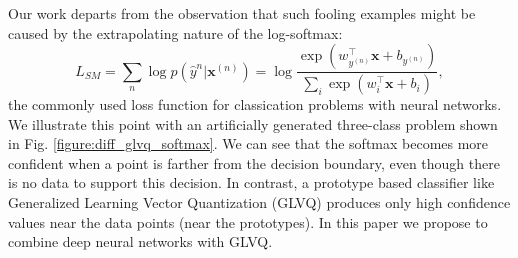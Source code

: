 \documentclass{esannV2}
\begin{document}
Our work departs from the observation that such fooling examples might be caused by the extrapolating nature of the log-softmax:
\begin{equation}
L_{SM} = \sum_n \log p(\hat{y}^{n}| \mathbf{x}^{(n)}) = \log \frac{\exp(w_{y^{(n)}}^\top \mathbf{x} + b_{y^{(n)}})}{\sum_i \exp(w_i^\top \mathbf{x} + b_i)},
\end{equation}
the commonly used loss function for classication problems with neural networks. We illustrate this point with an artificially generated three-class problem shown in Fig. \ref{figure:diff_glvq_softmax}. 
We can see that the softmax becomes more confident when a point is farther from the decision boundary, even though there is no data to support this decision. In contrast, a prototype based classifier like Generalized Learning Vector Quantization (GLVQ) \cite{sato1996generalized} produces only high confidence values near the data points (near the prototypes). In this paper we propose to combine deep neural networks with GLVQ. 
\end{document}
